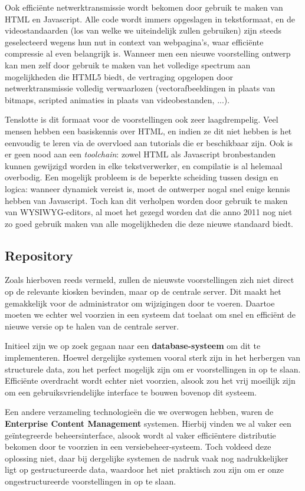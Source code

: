 Ook efficiënte netwerktransmissie wordt bekomen door gebruik te maken van HTML en Javascript. Alle code wordt immers opgeslagen in tekstformaat, en de videostandaarden (los van welke we uiteindelijk zullen gebruiken) zijn steeds geselecteerd wegens hun nut in context van webpagina's, waar efficiënte compressie al even belangrijk is. Wanneer men een nieuwe voorstelling ontwerp kan men zelf door gebruik te maken van het volledige spectrum aan mogelijkheden die HTML5 biedt, de vertraging opgelopen door netwerktransmissie volledig verwaarlozen (vectorafbeeldingen in plaats van bitmaps, scripted animaties in plaats van videobestanden, ...).

Tenslotte is dit formaat voor de voorstellingen ook zeer laagdrempelig. Veel mensen hebben een basiskennis over HTML, en indien ze dit niet hebben is het eenvoudig te leren via de overvloed aan tutorials die er beschikbaar zijn. Ook is er geen nood aan een \emph{toolchain}: zowel HTML als Javascript bronbestanden kunnen gewijzigd worden in elke tekstverwerker, en compilatie is al helemaal overbodig.
Een mogelijk probleem is de beperkte scheiding tussen design en logica: wanneer dynamiek vereist is, moet de ontwerper nogal snel enige kennis hebben van Javascript. Toch kan dit verholpen worden door gebruik te maken van WYSIWYG-editors, al moet het gezegd worden dat die anno 2011 nog niet zo goed gebruik maken van alle mogelijkheden die deze nieuwe standaard biedt.

\subsection{Repository}

Zoals hierboven reeds vermeld, zullen de nieuwste voorstellingen zich niet direct op de relevante kiosken bevinden, maar op de centrale server. Dit maakt het gemakkelijk voor de administrator om wijzigingen door te voeren. Daartoe moeten we echter wel voorzien in een systeem dat toelaat om snel en efficiënt de nieuwe versie op te halen van de centrale server.

Initieel zijn we op zoek gegaan naar een \textbf{database-systeem} om dit te implementeren. Hoewel dergelijke systemen vooral sterk zijn in het herbergen van structurele data, zou het perfect mogelijk zijn om er voorstellingen in op te slaan. Efficiënte overdracht wordt echter niet voorzien, alsook zou het vrij moeilijk zijn om een gebruiksvriendelijke interface te bouwen bovenop dit systeem.

Een andere verzameling technologieën die we overwogen hebben, waren de \textbf{Enterprise Content Management} systemen. Hierbij vinden we al vaker een geïntegreerde beheersinterface, alsook wordt al vaker efficiëntere distributie bekomen door te voorzien in een versiebeheer-systeem. Toch voldeed deze oplossing niet, daar bij dergelijke systemen de nadruk vaak nog nadrukkelijker ligt op gestructureerde data, waardoor het niet praktisch zou zijn om er onze ongestructureerde voorstellingen in op te slaan.

